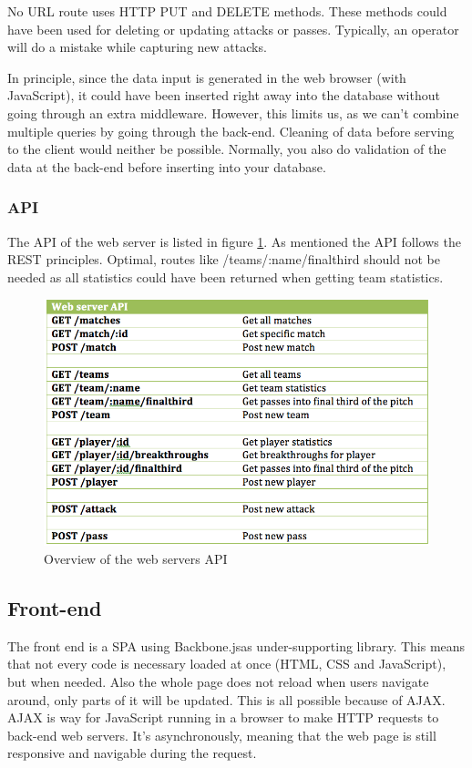 No URL route uses \ac{HTTP} PUT and DELETE methods. These methods could have been used for deleting or updating attacks or passes. Typically, an operator will do a mistake while capturing new attacks. 

In principle, since the data input is generated in the web browser (with JavaScript), it could have been inserted right away into the database without going through an extra middleware. However, this limits us, as we can’t combine multiple queries by going through the back-end. Cleaning of data before serving to the client would neither be possible. Normally, you also do validation of the data at the back-end before inserting into your database.

\subsubsection{API}

The \ac{API} of the web server is listed in figure \ref{fig:api}. As mentioned the \ac{API} follows the \ac{REST} principles. Optimal, routes like /teams/:name/finalthird should not be needed as all statistics could have been returned when getting team statistics. 

\begin{figure}[ht!]
\centering
\includegraphics[width=1\textwidth]{images/implementation/API.png}
\caption{Overview of the web servers API}
\label{fig:api}
\end{figure}

\subsection{Front-end}

The front end is a \ac{SPA} \cite{} using Backbone.js\footnotemark as under-supporting library. This means that not every code is necessary loaded at once (\ac{HTML}, \ac{CSS} and JavaScript), but when needed. Also the whole page does not reload when users navigate around, only parts of it will be updated. This is all possible because of \ac{AJAX}. \ac{AJAX} is way for JavaScript running in a browser to make HTTP requests to back-end web servers. It’s asynchronously, meaning that the web page is still responsive and navigable during the request\cite{ajax}.

